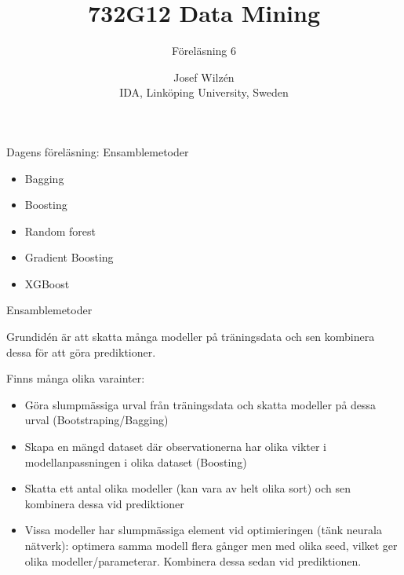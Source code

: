 \documentclass[10pt,english]{beamer}
\title{732G12 Data Mining}
\subtitle{Föreläsning 6}
\date{}
\author{Josef Wilzén \\ IDA, Linköping University, Sweden}
\begin{document}
\maketitle

\begin{frame}{Dagens föreläsning: Ensamblemetoder}

    \begin{itemize}
        \item Bagging
        \item Boosting
        \item Random forest
        \item Gradient Boosting 
        \item XGBoost
    \end{itemize}
    
\end{frame}


\begin{frame}{Ensamblemetoder}
    
    Grundidén är att skatta många modeller på träningsdata och sen kombinera dessa för att göra prediktioner.
    
    Finns många olika varainter:
     \begin{itemize}
        \item Göra slumpmässiga urval från träningsdata och skatta modeller på dessa urval (Bootstraping/Bagging)
        \item Skapa en mängd dataset där observationerna har olika vikter i modellanpassningen i olika dataset (Boosting)
        \item Skatta ett antal olika modeller (kan vara av helt olika sort) och sen kombinera dessa vid prediktioner
        \item Vissa modeller har slumpmässiga element vid optimieringen (tänk neurala nätverk): optimera samma modell flera gånger men med olika seed, vilket ger olika modeller/parameterar. Kombinera dessa sedan vid prediktionen.
    \end{itemize}

\end{frame}
\end{document}
